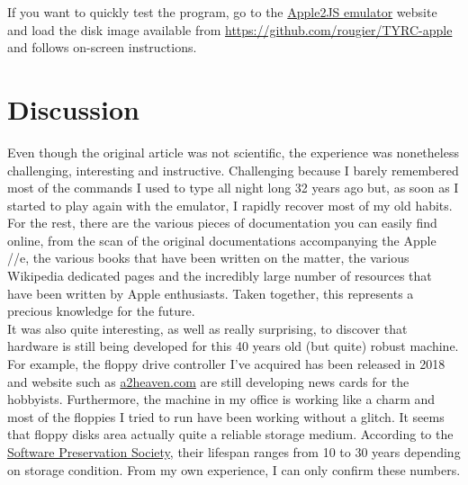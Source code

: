 If you want to quickly test the program, go to
the \href{https://www.scullinsteel.com/apple2/}{Apple2JS emulator} website and
load the disk image available from \url{https://github.com/rougier/TYRC-apple}
and follows on-screen instructions.

\section*{Discussion}

Even though the original article was not scientific, the experience was
nonetheless challenging, interesting and instructive. Challenging because I
barely remembered most of the commands I used to type all night long 32 years
ago but, as soon as I started to play again with the emulator, I rapidly
recover most of my old habits. For the rest, there are the various pieces of
documentation you can easily find online, from the scan of the original
documentations accompanying the Apple //e, the various books that have been
written on the matter, the various Wikipedia dedicated pages and the incredibly
large number of resources that have been written by Apple enthusiasts. Taken
together, this represents a precious knowledge for the future.\\

It was also quite interesting, as well as really surprising, to discover that
hardware is still being developed for this 40 years old (but quite) robust
machine. For example, the floppy drive controller I've acquired has been
released in 2018 and website such
as \href{https://www.a2heaven.com}{a2heaven.com} are still developing news
cards for the hobbyists. Furthermore, the machine in my office is working like a
charm and most of the floppies I tried to run have been working without a
glitch. It seems that floppy disks area actually quite a reliable storage
medium. According to the \href{http://www.softpres.org/}{Software Preservation
Society}, their lifespan ranges from 10 to 30 years depending on storage
condition\supercite{lowood:2009}. From my own experience, I can only confirm
these numbers.\\

